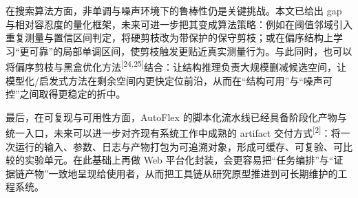 \documentclass[UTF8,a4paper,12pt,twoside]{ctexart}  %
\begin{document}
在搜索算法方面，非单调与噪声环境下的鲁棒性仍是关键挑战。本文已给出 gap 与相对容忍度的量化框架，未来可进一步把其变成算法策略：例如在阈值邻域引入重复测量与置信区间判定，将硬剪枝改为带保护的保守剪枝；或在偏序结构上学习``更可靠''的局部单调区间，使剪枝触发更贴近真实测量行为。与此同时，也可以将偏序剪枝与黑盒优化方法\textsuperscript{[24,25]}结合：让结构推理负责大规模删减候选空间，让模型化/启发式方法在剩余空间内更快定位前沿，从而在``结构可用''与``噪声可控''之间取得更稳定的折中。

最后，在可复现与可用性方面，AutoFlex 的脚本化流水线已经具备阶段化产物与统一入口，未来可以进一步对齐现有系统工作中成熟的 artifact 交付方式\textsuperscript{[2]}：将一次运行的输入、参数、日志与产物打包为可追溯对象，形成可缓存、可复验、可比较的实验单元。在此基础上再做 Web 平台化封装，会更容易把``任务编排''与``证据链产物''一致地呈现给使用者，从而把工具链从研究原型推进到可长期维护的工程系统。


\newpage
{}

{}
\renewcommand\refname{参考文献}
\end{document}
